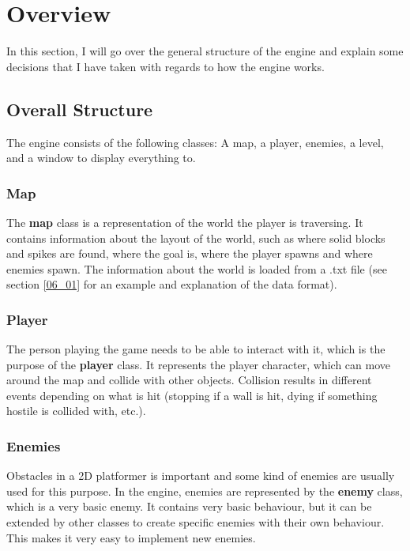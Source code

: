 \section{Overview}
\label{03}

In this section, I will go over the general structure of the engine and explain some decisions that I have taken with regards to how the engine works.

\subsection{Overall Structure}
\label{03_01}

The engine consists of the following classes: A map, a player, enemies, a level, and a window to display everything to.

\subsubsection{Map}
\label{03_01_01}

The \textbf{map} class is a representation of the world the player is traversing. It contains information about the layout of the world, such as where solid blocks and spikes are found, where the goal is, where the player spawns and where enemies spawn. The information about the world is loaded from a .txt file (see section \ref{06_01} for an example and explanation of the data format).

\subsubsection{Player}
\label{03_01_02}

The person playing the game needs to be able to interact with it, which is the purpose of the \textbf{player} class. It represents the player character, which can move around the map and collide with other objects. Collision results in different events depending on what is hit (stopping if a wall is hit, dying if something hostile is collided with, etc.).

\subsubsection{Enemies}
\label{03_01_03}

Obstacles in a 2D platformer is important and some kind of enemies are usually used for this purpose. In the engine, enemies are represented by the \textbf{enemy} class, which is a very basic enemy. It contains very basic behaviour, but it can be extended by other classes to create specific enemies with their own behaviour. This makes it very easy to implement new enemies.

